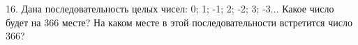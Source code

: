 16. Дана последовательность целых чисел: 0; 1; -1; 2; -2; 3; -3... Какое число будет на 366 месте? На каком месте в этой последовательности встретится число 366?\\
